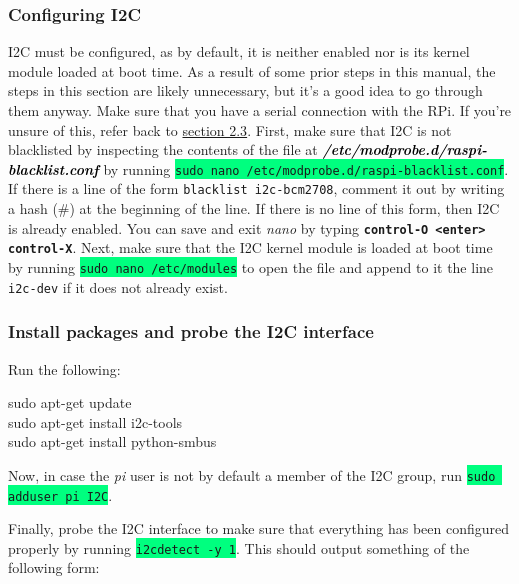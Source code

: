 \documentclass{article}
\newcommand*{\myfont}{\fontfamily{pcr}\selectfont}
\newcommand{\codei}[1]{\colorbox{SpringGreen}{\texttt{#1}}} %
\newcommand{\codeb}[2]{
  \begin{tcolorbox}[width=\textwidth,colback={SpringGreen},title={#1},colbacktitle=DarkGreen,coltitle=SpringGreen]
    \myfont
    #2
  \end{tcolorbox}
} %
\newcommand{\outputi}[1]{\colorbox{light-gray}{\texttt{#1}}} %
\newcommand{\red}[1]{\textcolor{BrickRed}{#1}} %
\newcommand{\loc}[1]{\textit{\textcolor{Black}{\textbf{#1}}}} %
\begin{document}
    \subsubsection{Configuring I2C}
      \label{sec:configuring-i2c}
      I2C must be configured, as by default, it is neither enabled nor is its kernel module loaded at boot time. As a result of some prior steps in this manual, the steps in this section are likely unnecessary, but it's a good idea to go through them anyway. Make sure that you have a serial connection with the RPi. If you're unsure of this, refer back to \hyperref[sec:connect-serial]{section 2.3}.
      \newline
      \indent
      First, make sure that I2C is not blacklisted by inspecting the contents of the file at \loc{/etc/modprobe.d/raspi-blacklist.conf} by running \codei{sudo nano /etc/modprobe.d/raspi-blacklist.conf}. If there is a line of the form \outputi{blacklist i2c-bcm\red{2708}}, comment it out by writing a hash (\#) at the beginning of the line. If there is no line of this form, then I2C is already enabled. You can save and exit \textit{nano} by typing \texttt{\textbf{control-O <enter> control-X}}.
      \newline
      \indent
      Next, make sure that the I2C kernel module is loaded at boot time by running \codei{sudo nano /etc/modules} to open the file and append to it the line \outputi{i2c-dev} if it does not already exist.
      \newline
      \indent
    \subsubsection{Install packages and probe the I2C interface}
    Run the following:
    \codeb{Update environment and install necessary packages}{
      sudo apt-get update \\
      sudo apt-get install i2c-tools \\
      sudo apt-get install python-smbus
    }

    Now, in case the \textit{pi} user is not by default a member of the I2C group, run \codei{sudo adduser pi I2C}.

    \newline\newline

    Finally, probe the I2C interface to make sure that everything has been configured properly by running \codei{i2cdetect -y 1}. This should output something of the following form:
\end{document}
